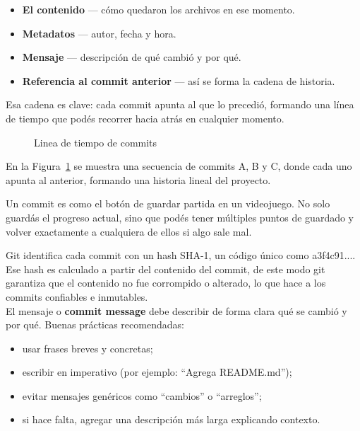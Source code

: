 \documentclass{apuntes_itsv}
\begin{document}
\begin{itemize}
  \item \textbf{El contenido} — cómo quedaron los archivos en ese momento.
  \item \textbf{Metadatos} — autor, fecha y hora.
  \item \textbf{Mensaje} — descripción de qué cambió y por qué.
  \item \textbf{Referencia al commit anterior} — así se forma la cadena de historia.
\end{itemize}

Esa cadena es clave: cada commit apunta al que lo precedió, formando una línea de tiempo que podés
recorrer hacia atrás en cualquier momento.

\begin{figure}[h]
  \centering
  \caption{Linea de tiempo de commits}
  \label{fig:commit_dag}
\end{figure}

En la Figura~\ref{fig:commit_dag} se muestra una secuencia de commits A, B y C, donde cada uno apunta
al anterior, formando una historia lineal del proyecto.

Un commit es como el botón de guardar partida en un videojuego. No solo guardás
el progreso actual, sino que podés tener múltiples puntos de guardado y volver exactamente a
cualquiera de ellos si algo sale mal.


Git identifica cada commit con un hash SHA-1, un código único como a3f4c91....
Ese hash es calculado a partir del contenido del commit, de este modo git garantiza que el contenido
no fue corrompido o alterado, lo que hace a los commits confiables e inmutables. \\

El mensaje o \textbf{commit message} debe describir de forma clara qué se cambió y por qué.
Buenas prácticas recomendadas:
\begin{itemize}
  \item usar frases breves y concretas;
  \item escribir en imperativo (por ejemplo: ``Agrega README.md'');
  \item evitar mensajes genéricos como ``cambios'' o ``arreglos'';
  \item si hace falta, agregar una descripción más larga explicando contexto.
\end{itemize}
\end{document}
